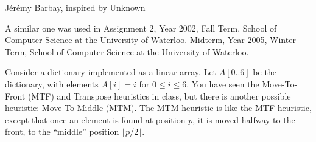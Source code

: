 \begin{authorship}J\'er\'emy Barbay, inspired by Unknown\end{authorship}
\begin{usage}
A similar one was used in Assignment 2, Year 2002, Fall Term, School of Computer Science at the University of Waterloo.
Midterm, Year 2005, Winter Term, School of Computer Science at the University of Waterloo.
\end{usage}
 Consider a dictionary implemented as a linear array.
%
Let $A[0..6]$ be the dictionary, with elements $A[i]=i$ for $0 \leq i
\leq 6$.
%
You have seen the Move-To-Front (MTF) and Transpose heuristics in
class, but there is another possible heuristic: Move-To-Middle (MTM).
%
The MTM heuristic is like the MTF heuristic, except that once
an element is found at position $p$, it is moved halfway to the front, 
to the ``middle'' position $\lfloor p/2\rfloor$.

